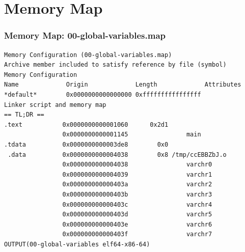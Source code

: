\documentclass[aspectratio=169, xcolor=table, notheorems, hyperref={pdfpagelabels=false}]{beamer}
\begin{document}
\section{Memory Map}
\begin{frame}[fragile]
\frametitle{Memory Map: 00-global-variables.map}
\begin{lstlisting}[basicstyle=\ttfamily\tiny]
Memory Configuration (00-global-variables.map)
Archive member included to satisfy reference by file (symbol)
Memory Configuration
Name             Origin             Length             Attributes
*default*        0x0000000000000000 0xffffffffffffffff
Linker script and memory map
== TL;DR ==
.text           0x0000000000001060      0x2d1
                0x0000000000001145                main
.tdata          0x0000000000003de8        0x0
 .data          0x0000000000004038        0x8 /tmp/ccEBBZbJ.o
                0x0000000000004038                varchr0
                0x0000000000004039                varchr1
                0x000000000000403a                varchr2
                0x000000000000403b                varchr3
                0x000000000000403c                varchr4
                0x000000000000403d                varchr5
                0x000000000000403e                varchr6
                0x000000000000403f                varchr7
OUTPUT(00-global-variables elf64-x86-64)

\end{lstlisting}

\end{frame}

\end{document}
